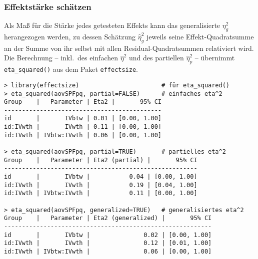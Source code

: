 \subsubsection{Effektstärke schätzen}

Als Maß für die Stärke jedes getesteten Effekts kann das generalisierte $\eta_{g}^{2}$ herangezogen werden, zu dessen Schätzung $\hat{\eta}_{g}^{2}$ jeweils seine Effekt-Quadratsumme an der Summe von ihr selbst mit allen Residual-Quadratsummen relativiert wird. Die Berechnung -- inkl.\ des einfachen $\hat{\eta}^{2}$ und des partiellen $\hat{\eta}_{p}^{2}$ -- übernimmt \lstinline!eta_squared()! aus dem Paket \lstinline!effectsize!.
\begin{lstlisting}
> library(effectsize)                       # für eta_squared()
> eta_squared(aovSPFpq, partial=FALSE)      # einfaches eta^2
Group    |   Parameter | Eta2 |       95% CI
--------------------------------------------
id       |       IVbtw | 0.01 | [0.00, 1.00]
id:IVwth |       IVwth | 0.11 | [0.00, 1.00]
id:IVwth | IVbtw:IVwth | 0.06 | [0.00, 1.00]

> eta_squared(aovSPFpq, partial=TRUE)       # partielles eta^2
Group    |   Parameter | Eta2 (partial) |       95% CI
------------------------------------------------------
id       |       IVbtw |           0.04 | [0.00, 1.00]
id:IVwth |       IVwth |           0.19 | [0.04, 1.00]
id:IVwth | IVbtw:IVwth |           0.11 | [0.00, 1.00]

> eta_squared(aovSPFpq, generalized=TRUE)   # generalisiertes eta^2
Group    |   Parameter | Eta2 (generalized) |       95% CI
----------------------------------------------------------
id       |       IVbtw |               0.02 | [0.00, 1.00]
id:IVwth |       IVwth |               0.12 | [0.01, 1.00]
id:IVwth | IVbtw:IVwth |               0.06 | [0.00, 1.00]
\end{lstlisting}

